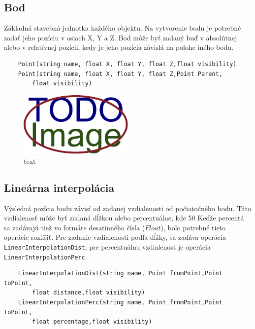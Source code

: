 \subsection{Bod}
Základná stavebná jednotka každého objektu. Na vytvorenie bodu je potrebné zadať jeho pozíciu v osiach X, Y a Z. Bod môže byť zadaný buď v absolútnej alebo v relatívnej pozícii, kedy je jeho pozícia závislá na polohe iného bodu.
\begin{lstlisting}
    Point(string name, float X, float Y, float Z,float visibility) 
    Point(string name, float X, float Y, float Z,Point Parent,
        float visibility)
\end{lstlisting}
\begin{figure}[H]
	\centering
	\includegraphics[width=0.5\textwidth]{obrazky-figures/placeholder.pdf}
	\caption{text}
	\label{fig:1}
\end{figure}

\subsection{Lineárna interpolácia}
Výsledná pozícia bodu závisí od zadanej vzdialenosti od počiatočného bodu. Táto vzdialenosť môže byť zadaná dĺžkou alebo percentuálne, kde 50%
Keďže percentá sa zadávajú tiež vo formáte desatinného čísla ($Float$), bolo potrebné tieto operácie rozlíšiť. Pre zadanie vzdialenosti podľa dĺžky, sa zadáva operácia \texttt{LinearInterpolationDist}, 
pre percentuálnu vzdialenosť je operácia \texttt{LinearInterpolationPerc}.
\begin{lstlisting}
    LinearInterpolationDist(string name, Point fromPoint,Point toPoint,
        float distance,float visibility)
    LinearInterpolationPerc(string name, Point fromPoint,Point toPoint,
        float percentage,float visibility)
\end{lstlisting}

